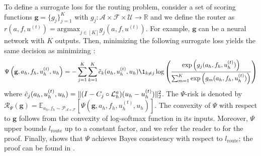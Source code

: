 \documentclass{article}
\begin{document}
To define a surrogate loss for the routing problem, consider a set of scoring functions $\mathbf{g} =\{g_j\}_{j = 1}^K$ with $g_j: \mathcal{A} \times \mathcal{F} \times \mathcal{U} \to \mathbb{R}$ and we define the router as $r(a, f, u^{(t)}) = \text{argmax}_{j \in [K]} g_j(a, f, u^{(t)})$. For example, $\mathbf{g}$ can be a neural network with $K$ outputs. Then, minimizing the following surrogate loss yields the same decision as minimizing :
\begin{equation} \label{eq:routersurrogate}
    \Psi\left(\mathbf{g}, a_h, f_h, u^{(t)}_h, u_h\right) = -\sum_{j = 1}^K \sum_{k = 1}^K\Tilde{c}_k(a_h, u^{(t)}_h, u_h)\1_{k\neq j}\log\left(\frac{\exp\left(g_j(a_h, f_h, u^{(t)}_h)\right)}{\sum_{m = 1}^K\exp\left(g_m(a_h, f_h, u^{(t)}_h)\right)}\right)
\end{equation}
where $\Tilde{c}_j(a_h, u^{(t)}_h, u_h) = \|( I - C_{j} \circ \mathcal{L}_{h}^a)(u_h - u^{(t)}_h)\|^2_2$.
The $\Psi$-risk is denoted by $\mathcal{R}_{\Psi}(\mathbf{g}) = \mathbb{E}_{a_h, f_h \sim \mathcal{P}_{\mathcal{A} \times \mathcal{F}}}[\Psi(\mathbf{g}, a_h, f_h, u^{(t)}_h, u_h)]$. The convexity of $\Psi$ with respect to $\mathbf{g}$ follows from the convexity of log-softmax function in its inputs. Moreover, $\Psi$ upper bounds $l_{\text{route}}$ up to a constant factor, and we refer the reader to  for the proof. Finally,  shows that $\Psi$ achieves Bayes consistency with respect to $l_{\text{route}}$; the proof can be found in .
\end{document}
